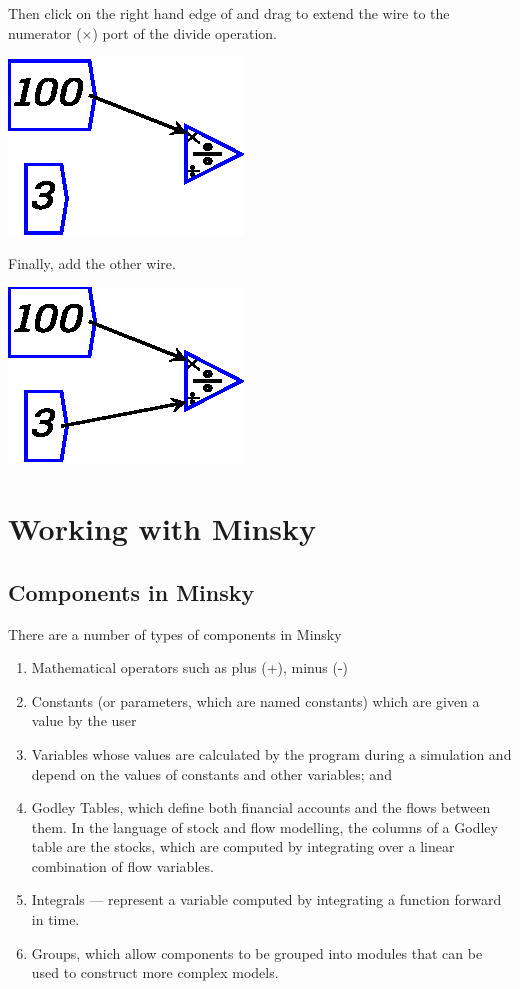 Then click on the right hand edge of 
and drag to extend the wire to the numerator ($\times$) port of the divide operation.

\begin{center}
\includegraphics{images/wireExample1.eps}
\end{center}

Finally, add the other wire.
\begin{center}
\includegraphics{images/wireExample2.eps}
\end{center}

\section{Working with Minsky}

\subsection{Components in Minsky}

There are a number of types of components in Minsky
\begin{enumerate}
\item Mathematical operators such as plus (+), minus (-)
\item Constants (or parameters, which are named constants) which are
given a value by the user 
\item Variables whose values are calculated by the program during a simulation and depend on the values of constants and other variables; and
\item Godley Tables, which define both financial accounts and the
flows between them. In the language of stock and flow modelling, the
columns of a Godley table are the stocks, which are computed by
integrating over a linear combination of flow variables.
\item Integrals --- represent a variable computed by integrating a
function forward in time.
\item Groups, which allow components to be grouped into modules that
can be used to construct more complex models.
\end{enumerate}


